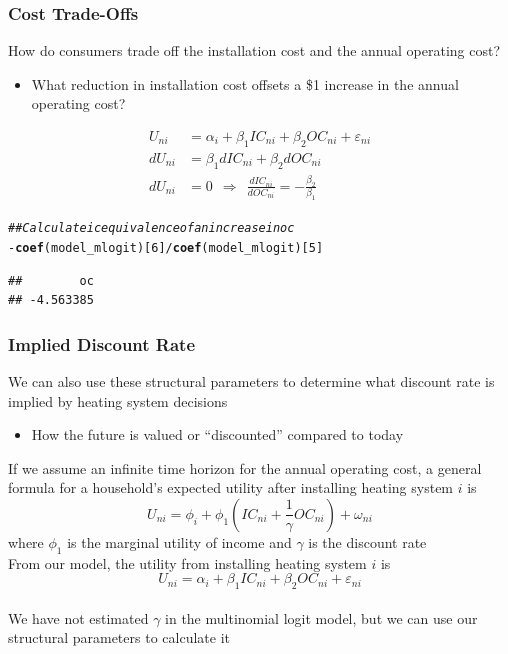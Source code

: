 \documentclass{beamer}\usepackage[]{graphicx}\usepackage[]{color}
\makeatletter
\newcommand{\hlnum}[1]{\textcolor[rgb]{0.686,0.059,0.569}{#1}}%
\newcommand{\hlcom}[1]{\textcolor[rgb]{0.678,0.584,0.686}{\textit{#1}}}%
\newcommand{\hlopt}[1]{\textcolor[rgb]{0,0,0}{#1}}%
\newcommand{\hlstd}[1]{\textcolor[rgb]{0.345,0.345,0.345}{#1}}%
\newcommand{\hlkwd}[1]{\textcolor[rgb]{0.737,0.353,0.396}{\textbf{#1}}}%
\newenvironment{kframe}{%
 \def\at@end@of@kframe{}%
 \ifinner\ifhmode%
  \def\at@end@of@kframe{\end{minipage}}%
  \begin{minipage}{\columnwidth}%
 \fi\fi%
 \def\FrameCommand##1{\hskip\@totalleftmargin \hskip-\fboxsep
 \colorbox{shadecolor}{##1}\hskip-\fboxsep
     \hskip-\linewidth \hskip-\@totalleftmargin \hskip\columnwidth}%
 \MakeFramed {\advance\hsize-\width
   \@totalleftmargin\z@ \linewidth\hsize
   \@setminipage}}%
 {\par\unskip\endMakeFramed%
 \at@end@of@kframe}
\newenvironment{knitrout}{}{} %
\makeatother
\begin{document}
\begin{frame}[fragile]\frametitle{Cost Trade-Offs}
    How do consumers trade off the installation cost and the annual operating cost?
    \begin{itemize}
        \item What reduction in installation cost offsets a \$1 increase in the annual operating cost?
    \end{itemize}
    \begin{align*}
        U_{ni} & = \alpha_i + \beta_1 IC_{ni} + \beta_2 OC_{ni} + \varepsilon_{ni} \\
        dU_{ni} & = \beta_1 dIC_{ni} + \beta_2 dOC_{ni} \\
        dU_{ni} & = 0 ~~ \Rightarrow ~~ \frac{dIC_{ni}}{dOC_{ni}} = -\frac{\beta_2}{\beta_1}
    \end{align*}
\begin{knitrout}\footnotesize
{}\color{fgcolor}\begin{kframe}
\begin{alltt}
\hlcom{## Calculate ic equivalence of an increase in oc}
\hlopt{-}\hlkwd{coef}\hlstd{(model_mlogit)[}\hlnum{6}\hlstd{]} \hlopt{/} \hlkwd{coef}\hlstd{(model_mlogit)[}\hlnum{5}\hlstd{]}
\end{alltt}
\begin{verbatim}
##        oc 
## -4.563385
\end{verbatim}
\end{kframe}
\end{knitrout}
\end{frame}

\begin{frame}\frametitle{Implied Discount Rate}
    We can also use these structural parameters to determine what discount rate is implied by heating system decisions
    \begin{itemize}
        \item How the future is valued or ``discounted'' compared to today
    \end{itemize}
    \vspace{2ex}
    If we assume an infinite time horizon for the annual operating cost, a general formula for a household's expected utility after installing heating system $i$ is
    $$U_{ni} = \phi_i + \phi_1 \left( IC_{ni} + \frac{1}{\gamma} OC_{ni} \right) + \omega_{ni}$$
    where $\phi_1$ is the marginal utility of income and $\gamma$ is the discount rate \\
    \vspace{2ex}
    From our model, the utility from installing heating system $i$ is
    $$U_{ni} = \alpha_i + \beta_1 IC_{ni} + \beta_2 OC_{ni} + \varepsilon_{ni}$$ \\
    \vspace{1ex}
    We have not estimated $\gamma$ in the multinomial logit model, but we can use our structural parameters to calculate it
\end{frame}
\end{document}
